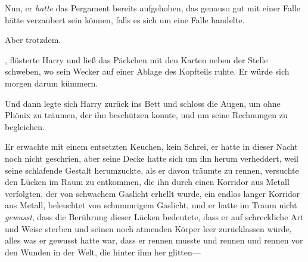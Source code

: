 Nun, er \emph{hatte} das Pergament bereits aufgehoben, das genauso gut mit einer Falle hätte verzaubert sein können, falls es sich um eine Falle handelte.

Aber trotzdem.

, flüsterte Harry und ließ das Päckchen mit den Karten neben der Stelle schweben, wo sein Wecker auf einer Ablage des Kopfteils ruhte. Er würde sich morgen darum kümmern.

Und dann legte sich Harry zurück ins Bett und schloss die Augen, um ohne Phönix zu träumen, der ihn beschützen konnte, und um seine Rechnungen zu begleichen.

\later

Er erwachte mit einem entsetzten Keuchen, kein Schrei, er hatte in dieser Nacht noch nicht geschrien, aber seine Decke hatte sich um ihn herum verheddert, weil seine schlafende Gestalt herumzuckte, als er davon träumte zu rennen, versuchte den Lücken im Raum zu entkommen, die ihn durch einen Korridor aus Metall verfolgten, der von schwachem Gaslicht erhellt wurde, ein endlos langer Korridor aus Metall, beleuchtet von schummrigem Gaslicht, und er hatte im Traum nicht \emph{gewusst}, dass die Berührung dieser Lücken bedeutete, dass er auf schreckliche Art und Weise sterben und seinen noch atmenden Körper leer zurücklassen würde, alles was er gewusst hatte war, dass er rennen musste und rennen und rennen vor den Wunden in der Welt, die hinter ihm her glitten—

